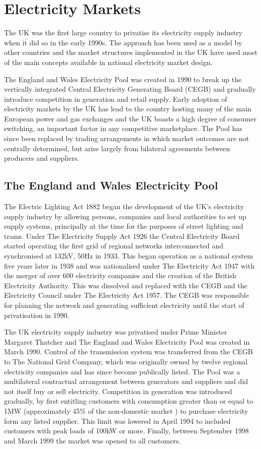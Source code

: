 \section{Electricity Markets}
The UK was the first large country to privatise its electricity supply industry
when it did so in the early 1990s.  The approach has been used as a model
by other countries and the market structures implemented in the UK have used
most of the main concepts available in national electricity market design.

The England and Wales Electricity Pool was created in 1990 to break up the
vertically integrated Central Electricity Generating Board (CEGB) and
gradually introduce competition in generation and retail supply.  Early
adoption of electricity markets by the UK has lead to the country hosting many
of the main European power and gas exchanges and the UK boasts a high degree
of consumer switching, an important factor in any competitive marketplace.  The
Pool has since been replaced by trading arrangements in which market outcomes
are not centrally determined, but arise largely from bilateral agreements
between producers and suppliers.

\subsection{The England and Wales Electricity Pool}
\label{sec:thepool}
The Electric Lighting Act 1882 began the development of the UK's electricity
supply industry by allowing persons, companies and local authorities to set up
supply systems, principally at the time for the purposes of street lighting and
trams.  Under The Electricity Supply Act 1926 the Central Electricity Board
started operating the first grid of regional networks interconnected and
synchronised at 132kV, 50Hz in 1933.  This began operation as a national system
five years later in 1938 and was nationalised under The Electricity Act 1947
with the merger of over 600 electricity companies and the creation of the
British Electricity Authority.  This was dissolved and replaced with the
CEGB and the Electricity Council under The Electricity Act 1957.  The CEGB was
responsible for planning the network and generating sufficient electricity until the start of privatisation in 1990.

The UK electricity supply industry was privatised under Prime Minister
Margaret Thatcher and The England and Wales Electricity Pool was created in
March 1990.  Control of the transmission system was transferred from the
CEGB to The National Grid Company, which was originally owned by twelve
regional electricity companies and has since become publically listed.  The
Pool was a multilateral contractual arrangement between generators and suppliers and did
not itself buy or sell electricity.  Competition in generation was introduced
gradually, by first entitling customers with consumption greater than or equal
to 1MW (approximately 45\% of the non-domestic market \cite{decc:dukes09}) to
purchase electricity form any listed supplier.  This limit was lowered in April
1994 to included customers with peak loads of 100kW or more.  Finally, between
September 1998 and March 1999 the market was opened to all customers.

